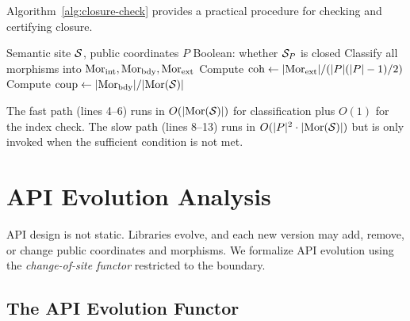 \documentclass[11pt]{article}
\newcommand{\CohIndex}{\mathrm{coh}}
\newcommand{\CoupIndex}{\mathrm{coup}}
\begin{document}
Algorithm~\ref{alg:closure-check} provides a practical procedure for
checking and certifying closure.

\begin{algorithm}[H]
\caption{API Closure Verification}\label{alg:closure-check}
\begin{algorithmic}[1]
\REQUIRE Semantic site $\mathcal{S}$, public coordinates $P$
\ENSURE Boolean: whether $\mathcal{S}_P$ is closed
\STATE Classify all morphisms into $\mathrm{Mor}_{\mathrm{int}}, \mathrm{Mor}_{\mathrm{bdy}}, \mathrm{Mor}_{\mathrm{ext}}$
\STATE Compute $\CohIndex \leftarrow |\Mor_{\mathrm{ext}}| / (|P|(|P|-1)/2)$
\STATE Compute $\CoupIndex \leftarrow |\Mor_{\mathrm{bdy}}| / |\Mor(\Site)|$
\IF{$\CohIndex \geq 1 - \epsilon$ \AND $\CoupIndex \leq \delta$ \AND $\epsilon + \delta < 1/|P|$}
  \RETURN \TRUE {}
\ENDIF
\STATE {}
      \RETURN \FALSE
    \ENDIF
  \ENDFOR
\ENDFOR
\RETURN \TRUE
\end{algorithmic}
\end{algorithm}

The fast path (lines 4--6) runs in $O(|\mathrm{Mor}(\mathcal{S})|)$ for classification
plus $O(1)$ for the index check.  The slow path (lines 8--13) runs in
$O(|P|^2 \cdot |\mathrm{Mor}(\mathcal{S})|)$ but is only invoked when the sufficient
condition is not met.

\section{API Evolution Analysis}\label{sec:evolution}

API design is not static.  Libraries evolve, and each new version may add,
remove, or change public coordinates and morphisms.  We formalize API
evolution using the \emph{change-of-site functor} restricted to the
boundary.

\subsection{The API Evolution Functor}
\end{document}
